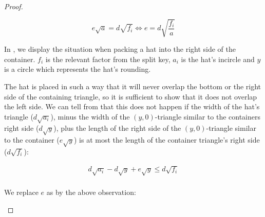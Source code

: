 \documentclass[%
    a4paper,              %
    style=screen,          %
    bibliography=totoc,   %
    nexus,                %
    lnum,                 %
    extramargin,          %
]{tubsbook}
\newcommand\defaulta{30}
\newcommand\defaultb{40}
\newcommand\defaultx{0.6}
\begin{document}
\begin{proof}
\begin{itemize}
            $$e\sqrt{a} = d\sqrt{f_i} \iff e = d\sqrt{\frac{f_i}{a}}$$


            \begin{figure}[htbp!]
                \centering


                \caption{}
                \label{fig:hatpokef}
            \end{figure}

            In , we display the situation when packing a hat into the right side of the container. $f_i$ is the relevant factor from the split key, $a_i$ is the hat's incircle and $y$ is a circle which represents the hat's rounding.

            \begin{figure}[htbp!]
                \centering


                \caption{}
                \label{fig:hatpoke}
            \end{figure}

            The hat is placed in such a way that it will never overlap the bottom or the right side of the containing triangle, so it is sufficient to show that it does not overlap the left side.
            We can tell from  that this does not happen if the width of the hat's triangle ($d\sqrt{a_i}$), minus the width of the $(y,0)$-triangle similar to the containers right side ($d\sqrt{y}$), plus the length of the right side of the $(y,0)$-triangle similar to the container ($e\sqrt{y}$) is at most the length of the container triangle's right side ($d\sqrt{f_i}$):

            \begin{align*}
                d\sqrt{a_i} - d\sqrt{y} + e\sqrt{y} \le d\sqrt{f_i}\\
            \end{align*}

            We replace $e$ as by the above observation:


\end{itemize}
\end{proof}
\end{document}
